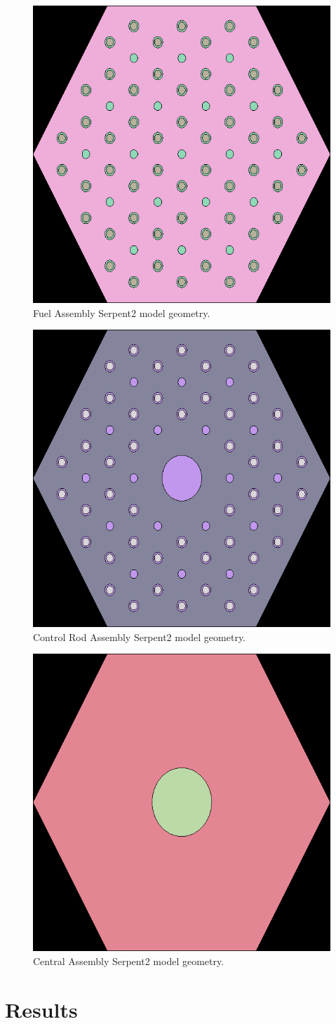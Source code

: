 \begin{figure}[H]
	\centering
	\includegraphics[width=0.4\linewidth]{figures/fuel_block_geom1.png} 
	\hfill
	\caption{Fuel Assembly Serpent2 model geometry.}
	\label{fig:FuelAssembly}
\end{figure}

\begin{figure}[H]
	\centering
	\includegraphics[width=0.4\linewidth]{figures/control_block_geom1.png} 
	\hfill
	\caption{Control Rod Assembly Serpent2 model geometry.}
	\label{fig:ControlRodAssembly}
\end{figure}

\begin{figure}[H]
	\centering
	\includegraphics[width=0.4\linewidth]{figures/central_block_geom1.png}
	\hfill
	\caption{Central Assembly Serpent2 model geometry.}
	\label{fig:CentralAssembly}
\end{figure}

\section{Results}

